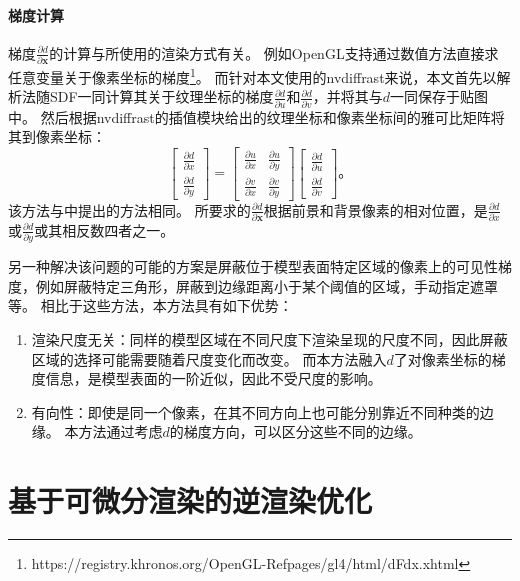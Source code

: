 \paragraph{梯度计算}
梯度$\frac{\partial d}{\partial \mathbf{x}}$的计算与所使用的渲染方式有关。
例如OpenGL支持通过数值方法直接求任意变量关于像素坐标的梯度\footnote{https://registry.khronos.org/OpenGL-Refpages/gl4/html/dFdx.xhtml}。
而针对本文使用的nvdiffrast来说，本文首先以解析法随SDF一同计算其关于纹理坐标的梯度$\frac{\partial d}{\partial u}$和$\frac{\partial d}{\partial v}$，并将其与$d$一同保存于贴图中。
然后根据nvdiffrast的插值模块给出的纹理坐标和像素坐标间的雅可比矩阵将其到像素坐标：
\begin{equation}
    \begin{bmatrix}
        \frac{\partial d}{\partial x} \\
        \frac{\partial d}{\partial y}
    \end{bmatrix} = \begin{bmatrix}
        \frac{\partial u}{\partial x} & \frac{\partial u}{\partial y} \\
        \frac{\partial v}{\partial x} & \frac{\partial v}{\partial y}
    \end{bmatrix} \begin{bmatrix}
        \frac{\partial d}{\partial u} \\
        \frac{\partial d}{\partial v}
    \end{bmatrix}
\text{。}
\end{equation}
该方法与\citet{sdf_glyphs}中提出的方法相同。
所要求的$\frac{\partial d}{\partial \mathbf{x}}$根据前景和背景像素的相对位置，是$\frac{\partial d}{\partial x}$或$\frac{\partial d}{\partial y}$或其相反数四者之一。

另一种解决该问题的可能的方案是屏蔽位于模型表面特定区域的像素上的可见性梯度，例如屏蔽特定三角形，屏蔽到边缘距离小于某个阈值的区域，手动指定遮罩等。
相比于这些方法，本方法具有如下优势：
\begin{enumerate}
\item 渲染尺度无关：同样的模型区域在不同尺度下渲染呈现的尺度不同，因此屏蔽区域的选择可能需要随着尺度变化而改变。
而本方法融入$d$了对像素坐标的梯度信息，是模型表面的一阶近似，因此不受尺度的影响。
\item 有向性：即使是同一个像素，在其不同方向上也可能分别靠近不同种类的边缘。
本方法通过考虑$d$的梯度方向，可以区分这些不同的边缘。
\end{enumerate}

\section{基于可微分渲染的逆渲染优化}

